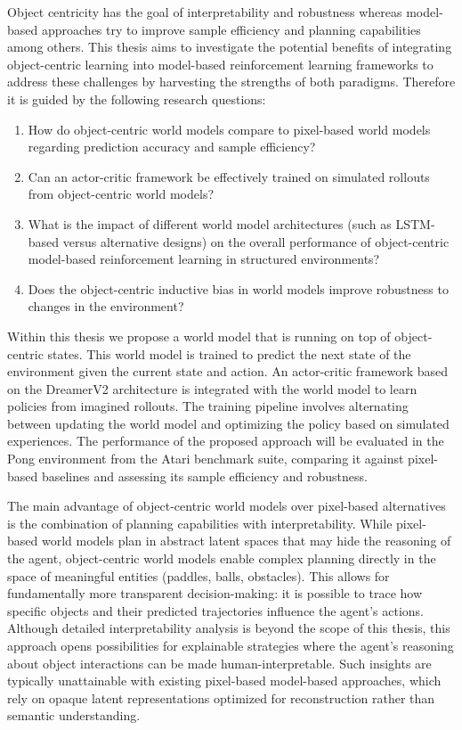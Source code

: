 \documentclass[
	english,
	ruledheaders=section,
	class=report,
	thesis={type=master},
	accentcolor=9c,
	custommargins=true,
	marginpar=false,
	parskip=half-,
	fontsize=11pt,
	pdfa=true,
]{tudapub}
\newcommand{\worldmodel}{world model}
\begin{document}
Object centricity has the goal of interpretability and robustness whereas model-based approaches try to improve sample efficiency and planning capabilities
among others. This thesis aims to investigate the potential benefits of
integrating object-centric learning into model-based reinforcement learning
frameworks to address these challenges by harvesting the strengths of both
paradigms. Therefore it is guided by the following research questions:
\begin{enumerate}
	\item How do object-centric \worldmodel{}s compare to pixel-based \worldmodel{}s
	      regarding prediction accuracy and sample efficiency?
	\item Can an actor-critic framework be effectively trained on simulated rollouts from
	      object-centric \worldmodel{}s?
	\item What is the impact of different \worldmodel{} architectures (such as LSTM-based
	      versus alternative designs) on the overall performance of object-centric model-based reinforcement learning in structured environments?
	\item Does the object-centric inductive bias in \worldmodel{}s improve robustness to
	      changes in the environment?
\end{enumerate}

Within this thesis we propose a \worldmodel{} that is running on top
of object-centric states. This \worldmodel{} is trained to predict the next state of the
environment given the current state and action. An actor-critic framework based
on the DreamerV2 \cite{DBLP:conf/iclr/HafnerLB020} architecture is integrated with the
\worldmodel{} to learn policies from imagined rollouts. The training pipeline
involves alternating between updating the \worldmodel{} and optimizing the
policy based on simulated experiences. The performance of the proposed approach
will be evaluated in the Pong environment from the Atari benchmark suite,
comparing it against pixel-based baselines and assessing its sample efficiency
and robustness.

The main advantage of object-centric \worldmodel{}s over pixel-based alternatives
is the combination of planning capabilities with interpretability. While
pixel-based \worldmodel{}s plan in abstract latent spaces that may hide 
the reasoning of the agent, object-centric \worldmodel{}s enable complex planning
directly in the space of meaningful entities (paddles, balls, obstacles). This
allows for fundamentally more transparent decision-making: it is possible to trace how
specific objects and their predicted trajectories influence the agent's
actions. Although detailed interpretability analysis is beyond the scope of
this thesis, this approach opens possibilities for explainable strategies where
the agent's reasoning about object interactions can be made human-interpretable.
Such insights are typically unattainable with existing pixel-based
model-based approaches, which rely on opaque latent representations optimized
for reconstruction rather than semantic understanding.
\end{document}
